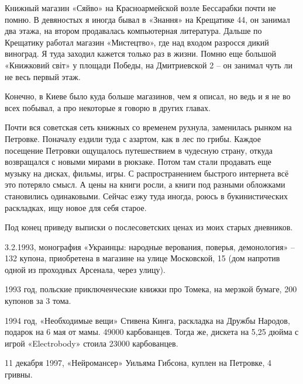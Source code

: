 Книжный магазин «Сяйво» на Красноармейской возле Бессарабки почти не помню. В девяностых я иногда бывал в «Знання» на Крещатике 44, он занимал два этажа, на втором продавалась компьютерная литература. Дальше по Крещатику работал магазин «Мистецтво», где над входом разросся дикий виноград. Я туда заходил кажется только раз в жизни. Помню еще большой «Книжковий світ» у площади Победы, на Дмитриевской 2 – он занимал чуть ли не весь первый этаж.

Конечно, в Киеве было куда больше магазинов, чем я описал, но ведь и я не во всех побывал, а про некоторые я говорю в других главах.

Почти вся советская сеть книжных со временем рухнула, заменилась рынком на Петровке. Поначалу ездили туда с азартом, как в лес по грибы. Каждое посещение Петровки ощущалось путешествием в чудесную страну, откуда возвращался с новыми мирами в рюкзаке. Потом там стали продавать еще музыку на дисках, фильмы, игры. С распространением быстрого интернета всё это потеряло смысл. А цены на книги росли, а книги под разными обложками становились одинаковыми. Сейчас езжу туда иногда, роюсь в букинистических раскладках, ищу новое для себя старое.

Под конец приведу выписки о послесоветских ценах из моих старых дневников.

3.2.1993, монография «Украинцы: народные верования, поверья, демонология» – 132 купона, приобретена в магазине на улице Московской, 15 (дом напротив одной из проходных Арсенала, через улицу).

1993 год, польские приключенческие книжки про Томека, на мерзкой бумаге, 200 купонов за 3 тома.

1994 год, «Необходимые вещи» Стивена Кинга, раскладка на Дружбы Народов, подарок на 6 мая от мамы. 49000 карбованцев. Тогда же, дискета на 5,25 дюйма с игрой «Electrobody» стоила 23000 карбованцев.

11 декабря 1997, «Нейромансер» Уильяма Гибсона, куплен на Петровке, 4 гривны.
